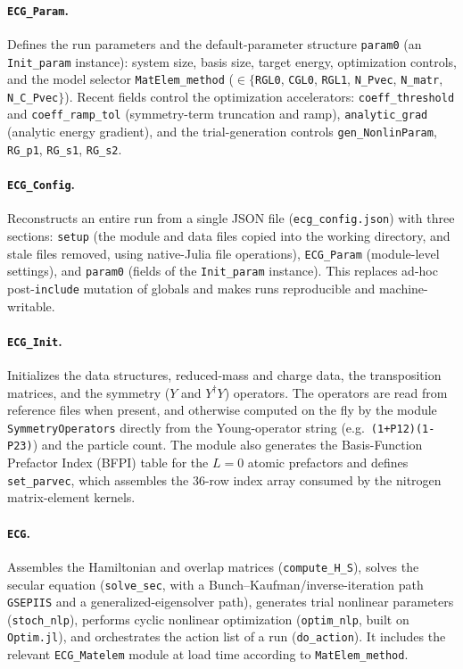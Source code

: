 \documentclass[11pt]{article}
\begin{document}
\paragraph{\texttt{ECG\_Param}.}
Defines the run parameters and the default-parameter structure \texttt{param0}
(an \texttt{Init\_param} instance): system size, basis size, target energy,
optimization controls, and the model selector \texttt{MatElem\_method}
($\in\{$\texttt{RGL0}, \texttt{CGL0}, \texttt{RGL1}, \texttt{N\_Pvec},
\texttt{N\_matr}, \texttt{N\_C\_Pvec}$\}$). Recent fields control the
optimization accelerators: \texttt{coeff\_threshold} and \texttt{coeff\_ramp\_tol}
(symmetry-term truncation and ramp), \texttt{analytic\_grad} (analytic energy
gradient), and the trial-generation controls
\texttt{gen\_NonlinParam}, \texttt{RG\_p1}, \texttt{RG\_s1}, \texttt{RG\_s2}.

\paragraph{\texttt{ECG\_Config}.}
Reconstructs an entire run from a single JSON file (\texttt{ecg\_config.json})
with three sections: \texttt{setup} (the module and data files copied into the
working directory, and stale files removed, using native-Julia file operations),
\texttt{ECG\_Param} (module-level settings), and \texttt{param0} (fields of the
\texttt{Init\_param} instance). This replaces ad-hoc post-\texttt{include}
mutation of globals and makes runs reproducible and machine-writable.

\paragraph{\texttt{ECG\_Init}.}
Initializes the data structures, reduced-mass and charge data, the
transposition matrices, and the symmetry ($Y$ and $Y^{\dagger}Y$) operators.
The operators are read from reference files when present, and otherwise
computed on the fly by the module \texttt{SymmetryOperators} directly from the
Young-operator string (e.g.\ \verb|(1+P12)(1-P23)|) and the particle count.
The module also generates the Basis-Function Prefactor Index (BFPI) table for
the $L=0$ atomic prefactors and defines \texttt{set\_parvec}, which assembles
the $36$-row index array consumed by the nitrogen matrix-element kernels.

\paragraph{\texttt{ECG}.}
Assembles the Hamiltonian and overlap matrices (\texttt{compute\_H\_S}), solves
the secular equation (\texttt{solve\_sec}, with a Bunch--Kaufman/inverse-iteration
path \texttt{GSEPIIS} and a generalized-eigensolver path), generates trial
nonlinear parameters (\texttt{stoch\_nlp}), performs cyclic nonlinear
optimization (\texttt{optim\_nlp}, built on \texttt{Optim.jl}), and orchestrates
the action list of a run (\texttt{do\_action}). It includes the relevant
\texttt{ECG\_Matelem} module at load time according to \texttt{MatElem\_method}.
\end{document}
